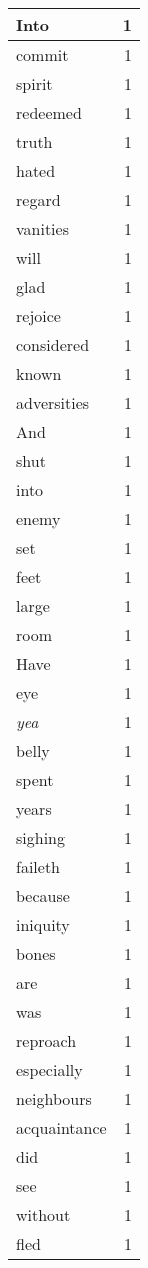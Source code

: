 \begin{center}
\begin{longtable}{l|r}
Into & 1 \\ \hline
commit & 1 \\ \hline
spirit & 1 \\ \hline
redeemed & 1 \\ \hline
truth & 1 \\ \hline
hated & 1 \\ \hline
regard & 1 \\ \hline
vanities & 1 \\ \hline
will & 1 \\ \hline
glad & 1 \\ \hline
rejoice & 1 \\ \hline
considered & 1 \\ \hline
known & 1 \\ \hline
adversities & 1 \\ \hline
And & 1 \\ \hline
shut & 1 \\ \hline
into & 1 \\ \hline
enemy & 1 \\ \hline
set & 1 \\ \hline
feet & 1 \\ \hline
large & 1 \\ \hline
room & 1 \\ \hline
Have & 1 \\ \hline
eye & 1 \\ \hline
\emph{yea} & 1 \\ \hline
belly & 1 \\ \hline
spent & 1 \\ \hline
years & 1 \\ \hline
sighing & 1 \\ \hline
faileth & 1 \\ \hline
because & 1 \\ \hline
iniquity & 1 \\ \hline
bones & 1 \\ \hline
are & 1 \\ \hline
was & 1 \\ \hline
reproach & 1 \\ \hline
especially & 1 \\ \hline
neighbours & 1 \\ \hline
acquaintance & 1 \\ \hline
did & 1 \\ \hline
see & 1 \\ \hline
without & 1 \\ \hline
fled & 1 \\ \hline

\end{longtable}
\end{center}
